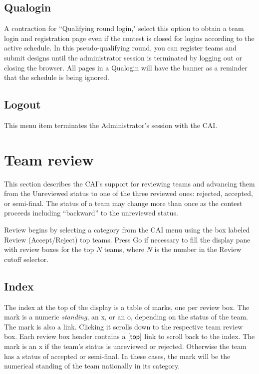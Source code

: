 \documentclass[11pt,letterpaper]{refart}
\def\ui#1{\textsf{#1}}
\begin{document}
\subsection{Qualogin}
A contraction for ``Qualifying round login," select this option to
obtain a team login and registration page even if the contest is
closed for logins according to the active schedule. In this
pseudo-qualifying round, you can register teams and submit designs
until the administrator session is terminated by logging out or
closing the browser. All pages in a Qualogin will have the banner
\ui{\color{red}{*** Admin Qualogin ***}} as a reminder that the
schedule is being ignored.

\subsection{Logout}
This menu item terminates the Administrator's session with the CAI.

\section{Team review}
This section describes the CAI's support for reviewing teams and
advancing them from the Unreviewed status to one of the three reviewed
ones: rejected, accepted, or semi-final. The status of a team may
change more than once as the contest proceeds including ``backward''
to the unreviewed status.

Review begins by selecting a category from the CAI menu using the box
labeled \ui{Review (Accept/Reject) top teams}. Press \ui{Go} if
necessary to fill the display pane with review boxes for the top $N$
teams, where $N$ is the number in the \ui{Review cutoff} selector.

\subsection{Index}
The index at the top of the display is a table of marks, one per
review box. The mark is a numeric \emph{standing}, an \ui{x}, or an
\ui{o}, depending on the status of the team. The mark is also a
link. Clicking it scrolls down to the respective team review box. Each
review box header contains a $[\hbox{\ui{top}}]$ link to scroll back
to the index. The mark is an \ui{x} if the team's status is unreviewed
or rejected. Otherwise the team has a status of accepted or
semi-final. In these cases, the mark will be the numerical standing of
the team nationally in its category.
\end{document}
